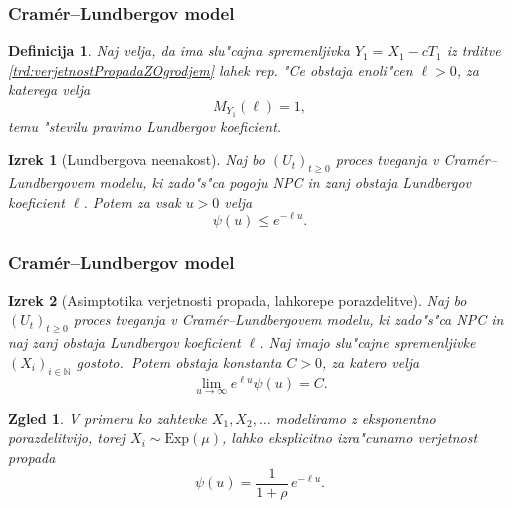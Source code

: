 \documentclass[handout]{beamer} %
\theoremstyle{plain}
\newtheorem{izrek}{Izrek}
\newtheorem{definicija}{Definicija}
\newtheorem{zgled}{Zgled}
\newcommand{\N}{\mathbb{N}}
\begin{document}
\begin{frame}
  \frametitle{Cramér--Lundbergov model}
  \begin{definicija}
    Naj velja, da ima slu"cajna spremenljivka $Y_1 = X_1 - cT_1$ iz trditve \ref{trd:verjetnostPropadaZOgrodjem} 
    lahek rep. "Ce obstaja enoli"cen $\ell > 0$, za katerega velja
    \begin{equation*}
        M_{Y_1}(\ell)  = 1,
    \end{equation*}
    temu "stevilu pravimo \textit{Lundbergov koeficient}.
    \label{def:LundbergovKoeficient}
  \end{definicija}
  \pause
  \begin{izrek}[Lundbergova neenakost]
    Naj bo $(U_t)_{t\geq0}$ proces tveganja v Cramér--Lundbergovem modelu, ki zado"s"ca pogoju NPC in 
     zanj obstaja Lundbergov koeficient $\ell$. Potem za vsak $u>0$ velja
    \begin{equation*}
        \psi(u) \leq e^{-\ell u}.
    \end{equation*}
    \label{izr:LundbergovaNeenakost}
  \end{izrek}
\end{frame}

\begin{frame}
  \frametitle{Cramér--Lundbergov model}
  \begin{izrek}[Asimptotika verjetnosti propada, lahkorepe porazdelitve]
    Naj bo $(U_t)_{t\geq0}$ proces tveganja v Cramér--Lundbergovem modelu, ki zado"s"ca NPC in 
    naj zanj obstaja Lundbergov koeficient $\ell$. Naj imajo slu"cajne spremenljivke 
    $(X_i)_{i\in\N}$ gostoto.\ Potem obstaja konstanta $C>0$, za katero velja 
    \begin{equation*}
        \lim_{u\to\infty}e^{\ell u}\psi(u) = C.
    \end{equation*}
    \label{izr:CramerjevaMeja}
\end{izrek}
\pause
\begin{zgled}
  V primeru ko zahtevke $X_1, X_2, \dots$ modeliramo z eksponentno porazdelitvijo, torej $X_i\sim\text{Exp}(\mu)$,
  lahko eksplicitno izra"cunamo verjetnost propada
  \begin{equation*}
    \psi(u) =  \frac{1}{1+\rho}\,e^{-\ell u}.
    \label{eq:eksplicitnaVerjetnostPropadaExp}
\end{equation*}
\end{zgled}
\end{frame}
\end{document}
